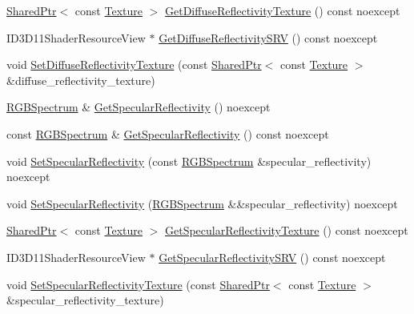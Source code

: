 \begin{DoxyCompactItemize}
\item 
\hyperlink{namespacemage_a1e01ae66713838a7a67d30e44c67703e}{Shared\+Ptr}$<$ const \hyperlink{classmage_1_1_texture}{Texture} $>$ \hyperlink{structmage_1_1_material_a5a3a56891f884d054dc09fc88e6d6c89}{Get\+Diffuse\+Reflectivity\+Texture} () const noexcept
\item 
I\+D3\+D11\+Shader\+Resource\+View $\ast$ \hyperlink{structmage_1_1_material_a20c4db65d5fb89178c0f6b6db2f87cda}{Get\+Diffuse\+Reflectivity\+S\+RV} () const noexcept
\item 
void \hyperlink{structmage_1_1_material_ac5e0b05a30ded7ffb744de4ecbd39e60}{Set\+Diffuse\+Reflectivity\+Texture} (const \hyperlink{namespacemage_a1e01ae66713838a7a67d30e44c67703e}{Shared\+Ptr}$<$ const \hyperlink{classmage_1_1_texture}{Texture} $>$ \&diffuse\+\_\+reflectivity\+\_\+texture)
\item 
\hyperlink{structmage_1_1_r_g_b_spectrum}{R\+G\+B\+Spectrum} \& \hyperlink{structmage_1_1_material_ad5fde8d972471fc99b72a4fc969883b1}{Get\+Specular\+Reflectivity} () noexcept
\item 
const \hyperlink{structmage_1_1_r_g_b_spectrum}{R\+G\+B\+Spectrum} \& \hyperlink{structmage_1_1_material_a81005b5094b99b9a8d7f16bedd195718}{Get\+Specular\+Reflectivity} () const noexcept
\item 
void \hyperlink{structmage_1_1_material_ac615e33c8e17149345488fed5c16dc7b}{Set\+Specular\+Reflectivity} (const \hyperlink{structmage_1_1_r_g_b_spectrum}{R\+G\+B\+Spectrum} \&specular\+\_\+reflectivity) noexcept
\item 
void \hyperlink{structmage_1_1_material_ade7fe7386618bd139e9c43699eba0a20}{Set\+Specular\+Reflectivity} (\hyperlink{structmage_1_1_r_g_b_spectrum}{R\+G\+B\+Spectrum} \&\&specular\+\_\+reflectivity) noexcept
\item 
\hyperlink{namespacemage_a1e01ae66713838a7a67d30e44c67703e}{Shared\+Ptr}$<$ const \hyperlink{classmage_1_1_texture}{Texture} $>$ \hyperlink{structmage_1_1_material_aefec704eaa03726eb569e10f10343c48}{Get\+Specular\+Reflectivity\+Texture} () const noexcept
\item 
I\+D3\+D11\+Shader\+Resource\+View $\ast$ \hyperlink{structmage_1_1_material_a04fad2f985ed5078a8217ebcfd51c3f0}{Get\+Specular\+Reflectivity\+S\+RV} () const noexcept
\item 
void \hyperlink{structmage_1_1_material_ae4fb6a048efeed96075e684fddefae26}{Set\+Specular\+Reflectivity\+Texture} (const \hyperlink{namespacemage_a1e01ae66713838a7a67d30e44c67703e}{Shared\+Ptr}$<$ const \hyperlink{classmage_1_1_texture}{Texture} $>$ \&specular\+\_\+reflectivity\+\_\+texture)

\end{DoxyCompactItemize}
